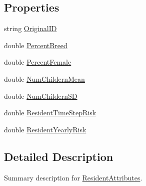 \subsection*{Properties}
\begin{DoxyCompactItemize}
\item 
string \hyperlink{class_s_e_a_r_c_h_1_1_resident_attributes_a0171054fecfa864caac09af157358e9e}{Original\-I\-D}
\item 
double \hyperlink{class_s_e_a_r_c_h_1_1_resident_attributes_a66a73e69674dea49472e9e58ecba2487}{Percent\-Breed}
\item 
double \hyperlink{class_s_e_a_r_c_h_1_1_resident_attributes_aba4a0c468662e0a988e4da1f2334ca99}{Percent\-Female}
\item 
double \hyperlink{class_s_e_a_r_c_h_1_1_resident_attributes_ac8c8ece96750b7903a78b0494b0e76a4}{Num\-Childern\-Mean}
\item 
double \hyperlink{class_s_e_a_r_c_h_1_1_resident_attributes_afd7000bf05088eb51b9af0a4058c91b3}{Num\-Childern\-S\-D}
\item 
double \hyperlink{class_s_e_a_r_c_h_1_1_resident_attributes_a235dd77c6271919b4c70387d341ff34d}{Resident\-Time\-Step\-Risk}
\item 
double \hyperlink{class_s_e_a_r_c_h_1_1_resident_attributes_a4b69906dab69ecf93b1098c65f88cbf3}{Resident\-Yearly\-Risk}
\end{DoxyCompactItemize}


\subsection{Detailed Description}
Summary description for \hyperlink{class_s_e_a_r_c_h_1_1_resident_attributes}{Resident\-Attributes}. 



